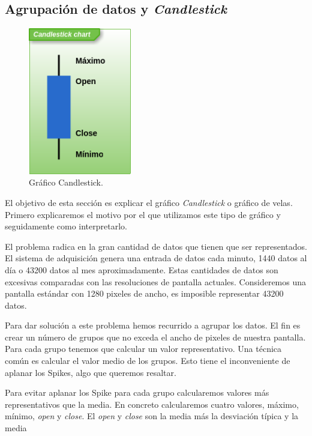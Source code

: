 	\subsection{Agrupación de datos y \emph{Candlestick}} 
		\begin{figure}
			\centering
	        	\includegraphics[keepaspectratio, width=0.40\textwidth]{./img/candlestick.png}
			\caption{Gráfico Candlestick.}
			\label{fig:candlestick}
		\end{figure}
		El objetivo de esta sección es explicar el gráfico \emph{Candlestick} o gráfico de velas. Primero explicaremos el motivo por el que
		utilizamos este tipo de gráfico y seguidamente como interpretarlo.
		\par
		El problema radica en la gran cantidad de datos que tienen que ser representados. El sistema de adquisición genera una entrada de
		datos cada minuto, 1440 datos al día o 43200 datos al mes aproximadamente. Estas cantidades de datos son excesivas comparadas con las
		resoluciones de pantalla actuales. Consideremos una pantalla estándar con 1280 pixeles de ancho, es imposible representar 43200 datos.
		\par
		Para dar solución a este problema hemos recurrido a agrupar los datos. El fin es crear un número de grupos que no exceda el ancho de
		pixeles de nuestra pantalla. Para cada grupo tenemos que calcular un valor representativo. Una técnica común es calcular el valor
		medio de los grupos.  Esto tiene el inconveniente de aplanar los Spikes, algo que queremos resaltar.
		\par
		Para evitar aplanar los Spike para cada grupo calcularemos valores más representativos que la media. En concreto calcularemos cuatro
		valores, máximo, mínimo, \emph{open} y \emph{close}. El \emph{open} y \emph{close} son la media más la desviación típica y la media
